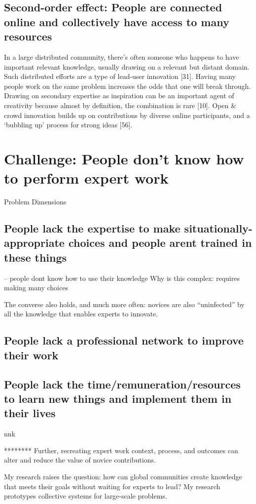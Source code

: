 \subsection{Second-order effect: People are connected online and collectively have access to many resources}
In a large distributed community, there’s often
someone who happens to have important relevant
knowledge, usually drawing on a relevant but distant domain. Such distributed efforts are a type of lead-user innovation [31]. Having many people work on the same problem increases the odds that one will break through. Drawing
on secondary expertise as inspiration can be an important
agent of creativity because almost by definition, the combination is rare [10]. Open \& crowd innovation builds up on
contributions by diverse online participants, and a ‘bubbling
up’ process for strong ideas [56].

\section{Challenge: People don't know how to perform expert work}
Problem Dimensions


\subsection{People lack the expertise to make situationally-appropriate choices and people aren\textquotesingle t trained in these things}
-- people dont know how to use their knowledge
Why is this complex: requires making many choices

The
converse also holds, and much more often: novices are also
“uninfected” by all the knowledge that enables experts to
innovate.

\subsection{People lack a professional network to improve their work}


\subsection{People lack the time/remuneration/resources to learn new things and implement them in their lives}
nnk

********
Further, recreating expert work context, process, and outcomes can alter and reduce the value of novice contributions.

My research raises the question: how can global communities create knowledge that meets their goals without waiting for experts to lead? My research prototypes collective systems for large-scale problems.

